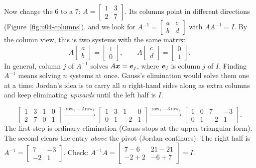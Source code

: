 Now change the $6$ to a $7$: $A=\begin{bmatrix} 1 & 3\\ 2 & 7\end{bmatrix}$. Its columns point
in different directions (Figure~\ref{fig:u04-columns}), and we look for
$A^{-1}=\begin{bmatrix} a & c\\ b & d\end{bmatrix}$ with $AA^{-1}=I$. By the column view,
this is two systems with the same matrix:
\[
  A\begin{bmatrix} a\\ b\end{bmatrix}=\begin{bmatrix} 1\\ 0\end{bmatrix},\qquad
  A\begin{bmatrix} c\\ d\end{bmatrix}=\begin{bmatrix} 0\\ 1\end{bmatrix}.
\]
In general, column $j$ of $A^{-1}$ solves $A\boldsymbol{x}=\boldsymbol{e}_j$, where $\boldsymbol{e}_j$ is column $j$
of $I$. Finding $A^{-1}$ means solving $n$ systems at once. Gauss's elimination would solve
them one at a time; Jordan's idea is to carry all $n$ right-hand sides along as extra columns
and keep eliminating \emph{upwards} until the left half is $I$.

\begin{example}\label{ex:u04-gj2}
\[
  \left[\begin{array}{rr|rr} 1 & 3 & 1 & 0\\ 2 & 7 & 0 & 1\end{array}\right]
  \xrightarrow{\ \text{row}_2-2\,\text{row}_1\ }
  \left[\begin{array}{rr|rr} 1 & 3 & 1 & 0\\ 0 & 1 & -2 & 1\end{array}\right]
  \xrightarrow{\ \text{row}_1-3\,\text{row}_2\ }
  \left[\begin{array}{rr|rr} 1 & 0 & 7 & -3\\ 0 & 1 & -2 & 1\end{array}\right].
\]
The first step is ordinary elimination (Gauss stops at the upper triangular form). The second
clears the entry \emph{above} the pivot (Jordan continues). The right half is
$A^{-1}=\begin{bmatrix} 7 & -3\\ -2 & 1\end{bmatrix}$. Check:
$A^{-1}A=\begin{bmatrix} 7-6 & 21-21\\ -2+2 & -6+7\end{bmatrix}=I$.
\end{example}

